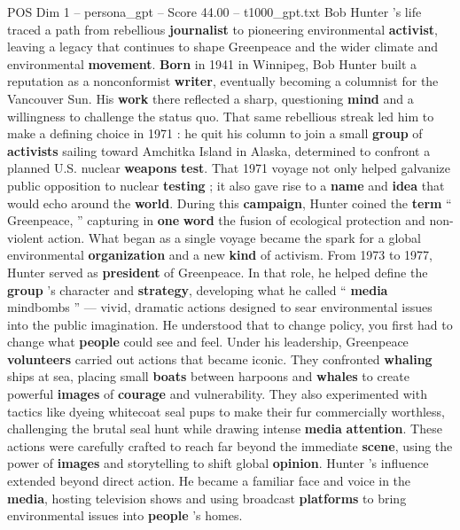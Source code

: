 \begin{textsample}{POS Dim 1 – persona\_gpt – Score 44.00 – t1000\_gpt.txt}  \label{ex:f1_pos_027}
Bob Hunter ’s life traced a path from rebellious \textbf{journalist} to pioneering environmental \textbf{activist}, leaving a legacy that continues to shape Greenpeace and the wider climate and environmental \textbf{movement}. \textbf{Born} in 1941 in Winnipeg, Bob Hunter built a reputation as a nonconformist \textbf{writer}, eventually becoming a columnist for the Vancouver Sun.
His \textbf{work} there reflected a sharp, questioning \textbf{mind} and a willingness to challenge the status quo.
That same rebellious streak led him to make a defining choice in 1971 : he quit his column to join a small \textbf{group} of \textbf{activists} sailing toward Amchitka Island in Alaska, determined to confront a planned U.S. nuclear \textbf{weapons} \textbf{test}.
That 1971 voyage not only helped galvanize public opposition to nuclear \textbf{testing} ; it also gave rise to a \textbf{name} and \textbf{idea} that would echo around the \textbf{world}.
During this \textbf{campaign}, Hunter coined the \textbf{term} “ Greenpeace, ” capturing in \textbf{one} \textbf{word} the fusion of ecological protection and non-violent action.
What began as a single voyage became the spark for a global environmental \textbf{organization} and a new \textbf{kind} of activism.
From 1973 to 1977, Hunter served as \textbf{president} of Greenpeace.
In that role, he helped define the \textbf{group} ’s character and \textbf{strategy}, developing what he called “ \textbf{media} mindbombs ” — vivid, dramatic actions designed to sear environmental issues into the public imagination.
He understood that to change policy, you first had to change what \textbf{people} could see and feel.
Under his leadership, Greenpeace \textbf{volunteers} carried out actions that became iconic.
They confronted \textbf{whaling} ships at sea, placing small \textbf{boats} between harpoons and \textbf{whales} to create powerful \textbf{images} of \textbf{courage} and vulnerability.
They also experimented with tactics like dyeing whitecoat seal pups to make their fur commercially worthless, challenging the brutal seal hunt while drawing intense \textbf{media} \textbf{attention}.
These actions were carefully crafted to reach far beyond the immediate \textbf{scene}, using the power of \textbf{images} and storytelling to shift global \textbf{opinion}.
Hunter ’s influence extended beyond direct action.
He became a familiar face and voice in the \textbf{media}, hosting television shows and using broadcast \textbf{platforms} to bring environmental issues into \textbf{people} ’s homes.

\end{textsample}
